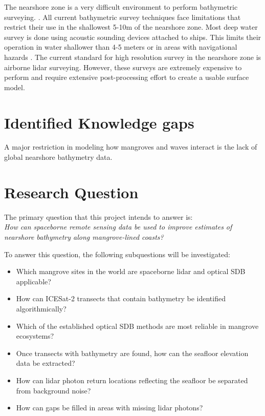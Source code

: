 The nearshore zone is a very difficult environment to perform bathymetric surveying. \parencite{Parrish2019}. All current bathymetric survey techniques face limitations that restrict their use in the shallowest 5-10m of the nearshore zone. Most deep water survey is done using acoustic sounding devices attached to ships. This limits their operation in water shallower than 4-5 meters or in areas with navigational hazards \parencite{Cesbron2021,Montys2015}. The current standard for high resolution survey in the nearshore zone is airborne lidar surveying. However, these surveys are extremely expensive to perform and require extensive post-processing effort to create a usable surface model.

\section{Identified Knowledge gaps}
A major restriction in modeling how mangroves and waves interact is the lack of global nearshore bathymetry data.
\section{Research Question}
The primary question that this project intends to answer is: \\

\emph{How can spaceborne remote sensing data be used to improve estimates of nearshore bathymetry along mangrove-lined coasts?}

To answer this question, the following subquestions will be investigated:

\begin{itemize}
      \item Which mangrove sites in the world are spaceborne lidar and optical SDB applicable?
      \item How can ICESat-2 transects that contain bathymetry be identified algorithmically?
      \item Which of the established optical SDB methods are most reliable in mangrove ecosystems?
      \item Once transects with bathymetry are found, how can the seafloor elevation data be extracted?
      \item How can lidar photon return locations reflecting the seafloor be separated from background noise?
      \item How can gaps be filled in areas with missing lidar photons?
\end{itemize}

